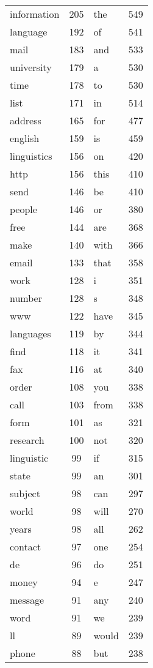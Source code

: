 \documentclass[10pt, a4paper]{article}
\begin{document}
\begin{longtable}{l c l c}
information & 205 & the & 549 \\
language & 192 & of & 541 \\
mail & 183 & and & 533 \\
university & 179 & a & 530 \\
time & 178 & to & 530 \\
list & 171 & in & 514 \\
address & 165 & for & 477 \\
english & 159 & is & 459 \\
linguistics & 156 & on & 420 \\
http & 156 & this & 410 \\
send & 146 & be & 410 \\
people & 146 & or & 380 \\
free & 144 & are & 368 \\
make & 140 & with & 366 \\
email & 133 & that & 358 \\
work & 128 & i & 351 \\
number & 128 & s & 348 \\
www & 122 & have & 345 \\
languages & 119 & by & 344 \\
find & 118 & it & 341 \\
fax & 116 & at & 340 \\
order & 108 & you & 338 \\
call & 103 & from & 338 \\
form & 101 & as & 321 \\
research & 100 & not & 320 \\
linguistic & 99 & if & 315 \\
state & 99 & an & 301 \\
subject & 98 & can & 297 \\
world & 98 & will & 270 \\
years & 98 & all & 262 \\
contact & 97 & one & 254 \\
de & 96 & do & 251 \\
money & 94 & e & 247 \\
message & 91 & any & 240 \\
word & 91 & we & 239 \\
ll & 89 & would & 239 \\
phone & 88 & but & 238 \\

\end{longtable}
\end{document}
